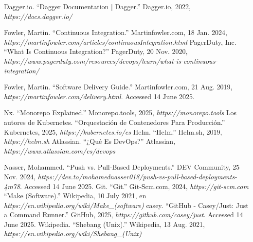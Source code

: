 

\begin{thebibliography}{99}
 Dagger.io. ``Dagger Documentation | Dagger.'' Dagger.io, 2022, {\it https://docs.dagger.io/}

 Fowler, Martin. ``Continuous Integration.'' Martinfowler.com, 18 Jan. 2024, {\it https://martinfowler.com/articles/continuousIntegration.html}
 PagerDuty, Inc. ``What Is Continuous Integration?'' PagerDuty, 20 Nov. 2020, {\it https://www.pagerduty.com/resources/devops/learn/what-is-continuous-integration/}

 Fowler, Martin. ``Software Delivery Guide.'' Martinfowler.com, 21 Aug. 2019, {\it https://martinfowler.com/delivery.html}. Accessed 14 June 2025.

 Nx. ``Monorepo Explained.'' Monorepo.tools, 2025, {\it https://monorepo.tools}
 Los autores de Kubernetes. ``Orquestación de Contenedores Para Producción.'' Kubernetes, 2025, {\it https://kubernetes.io/es}
 Helm. ``Helm.'' Helm.sh, 2019, {\it https://helm.sh}
 Atlassian. ``¿Qué Es DevOps?'' Atlassian, {\it https://www.atlassian.com/es/devops}

 Nasser, Mohammed. ``Push vs. Pull-Based Deployments.'' DEV Community, 25 Nov. 2024, {\it https://dev.to/mohamednasser018/push-vs-pull-based-deployments-4m78}. Accessed 14 June 2025.
 Git. ``Git.'' Git-Scm.com, 2024, {\it https://git-scm.com}
 ``Make (Software).'' Wikipedia, 10 July 2021, en {\it https://en.wikipedia.org/wiki/Make\_(software)}
 casey. ``GitHub - Casey/Just: Just a Command Runner.'' GitHub, 2025, {\it https://github.com/casey/just}. Accessed 14 June 2025.
 Wikipedia. ``Shebang (Unix).'' Wikipedia, 13 Aug. 2021, {\it https://en.wikipedia.org/wiki/Shebang\_(Unix)}




\end{thebibliography}

